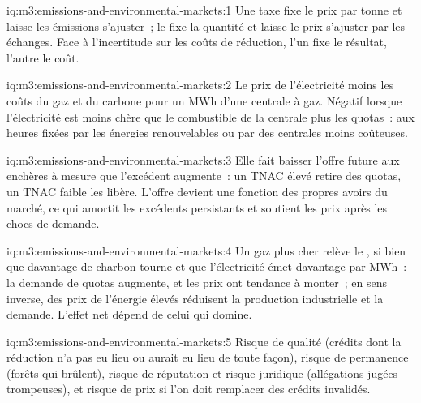 \begin{solution}{iq:m3:emissions-and-environmental-markets:1}
Une taxe fixe le prix par tonne et laisse les émissions s'ajuster~; le  fixe la quantité et laisse le
prix s'ajuster par les échanges. Face à l'incertitude sur les coûts de réduction, l'un fixe le résultat, l'autre le
coût.
\end{solution}

\begin{solution}{iq:m3:emissions-and-environmental-markets:2}
Le prix de l'électricité moins les coûts du gaz et du carbone pour un MWh d'une centrale à gaz. Négatif lorsque l'électricité est
moins chère que le combustible de la centrale plus les quotas~: aux heures fixées par les énergies renouvelables ou par des centrales moins coûteuses.
\end{solution}

\begin{solution}{iq:m3:emissions-and-environmental-markets:3}
Elle fait baisser l'offre future aux enchères à mesure que l'excédent augmente~: un TNAC élevé retire des quotas, un TNAC faible
les libère. L'offre devient une fonction des propres avoirs du marché, ce qui amortit les
excédents persistants et soutient les prix après les chocs de demande.
\end{solution}

\begin{solution}{iq:m3:emissions-and-environmental-markets:4}
Un gaz plus cher relève le , si bien que davantage de charbon tourne et que l'électricité émet davantage par MWh~: la demande de
quotas augmente, et les prix ont tendance à monter~; en sens inverse, des prix de l'énergie élevés réduisent la production industrielle et
la demande. L'effet net dépend de celui qui domine.
\end{solution}

\begin{solution}{iq:m3:emissions-and-environmental-markets:5}
Risque de qualité (crédits dont la réduction n'a pas eu lieu ou aurait eu lieu de toute façon), risque de permanence
(forêts qui brûlent), risque de réputation et risque juridique (allégations jugées trompeuses), et risque de prix si l'on doit
remplacer des crédits invalidés.
\end{solution}


